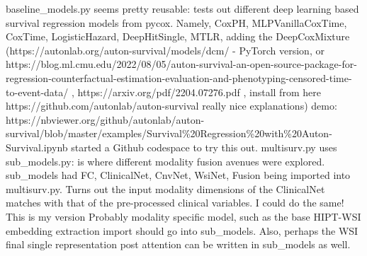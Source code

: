 \documentclass{article}%
\begin{document}
\newline%
\newline%
%
baseline\_models.py seems pretty reusable: tests out different deep learning based survival regression models from pycox. Namely, CoxPH, MLPVanillaCoxTime, CoxTime, LogisticHazard, DeepHitSingle, MTLR, %
\newline%
\newline%
%
adding the DeepCoxMixture (https://autonlab.org/auton{-}survival/models/dcm/ {-} PyTorch version, or https://blog.ml.cmu.edu/2022/08/05/auton{-}survival{-}an{-}open{-}source{-}package{-}for{-}regression{-}counterfactual{-}estimation{-}evaluation{-}and{-}phenotyping{-}censored{-}time{-}to{-}event{-}data/ , https://arxiv.org/pdf/2204.07276.pdf , install from here https://github.com/autonlab/auton{-}survival really nice explanations)%
\newline%
\newline%
%
demo: https://nbviewer.org/github/autonlab/auton{-}survival/blob/master/examples/Survival\%20Regression\%20with\%20Auton{-}Survival.ipynb %
\newline%
\newline%
%
started a Github codespace to try this out.%
\newline%
\newline%
%
multisurv.py uses sub\_models.py: is where different modality fusion avenues were explored. %
\newline%
\newline%
%
sub\_models had FC, ClinicalNet, CnvNet, WsiNet, Fusion being imported into multisurv.py. %
\newline%
\newline%
%
%
\newline%
\newline%
%
Turns out the input modality dimensions of the ClinicalNet matches with that of the pre{-}processed clinical variables. I could do the same! %
\newline%
\newline%
%
%
\newline%
\newline%
%
This is my version %
\newline%
\newline%
%
Probably modality specific model, such as the base HIPT{-}WSI embedding extraction import should go into sub\_models. Also, perhaps the WSI final single representation post attention can be written in sub\_models as well. %
\newline%
\newline%
\end{document}
